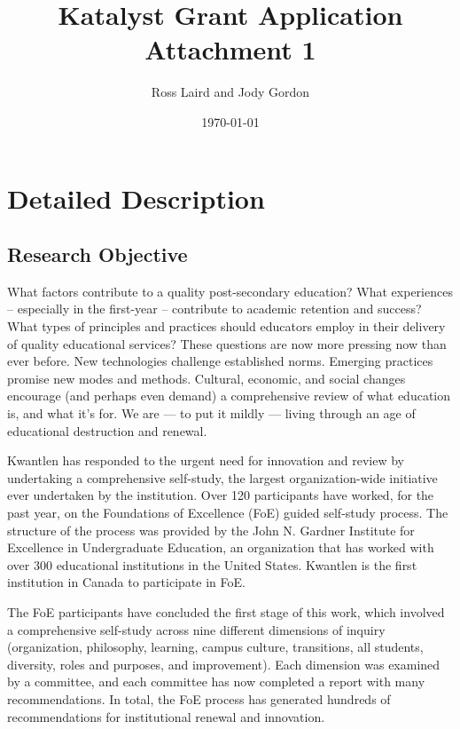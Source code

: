 \documentclass[letterpaper,10pt,headsepline]{scrreprt}
\author{Ross Laird and Jody Gordon}
\title{Katalyst Grant Application Attachment 1}
\date{\today}
\begin{document}
\begin{titlingpage}
\begin{center}
\maketitle
\end{center}
\end{titlingpage}
\setcounter{tocdepth}{3}
\tableofcontents

\vspace*{1cm}

\section{Detailed Description}

\subsection{Research Objective}

What factors contribute to a quality post-secondary education? What
experiences -- especially in the first-year -- contribute to academic
retention and success? What types of principles and practices should educators
employ in their delivery of quality educational services? These questions are
now more pressing now than ever before. New technologies challenge established
norms. Emerging practices promise new modes and methods. Cultural, economic,
and social changes encourage (and perhaps even demand) a comprehensive review
of what education is, and what it's for. We are --- to put it mildly ---
living through an age of educational destruction and renewal.

Kwantlen has responded to the urgent need for innovation and review by
undertaking a comprehensive self-study, the largest organization-wide
initiative ever undertaken by the institution. Over 120 participants have
worked, for the past year, on the Foundations of Excellence (FoE) guided
self-study process. The structure of the process was provided by the John N.
Gardner Institute for Excellence in Undergraduate Education, an organization
that has worked with over 300 educational institutions in the United States.
Kwantlen is the first institution in Canada to participate in FoE.

The FoE participants have concluded the first stage of this work, which
involved a comprehensive self-study across nine different dimensions of
inquiry (organization, philosophy, learning, campus culture, transitions, all
students, diversity, roles and purposes, and improvement). Each dimension was
examined by a committee, and each committee has now completed a report with
many recommendations. In total, the FoE process has generated hundreds of
recommendations for institutional renewal and innovation.
\end{document}
